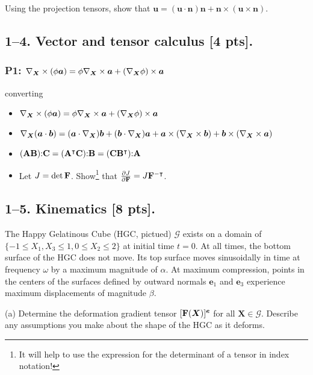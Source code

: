 Using the projection tensors, show that $\bm{u} = (\bm{u} \cdot \bm{n}) \bm{n} + \bm{n} \times (\bm{u} \times \bm{n} )$.

\bigskip
\subsection*{1--4. \textbf{Vector and tensor calculus} [4 pts].} 
\subsubsection*{P1: $\nabla_{\bm{X}} \times (\phi \bm{a}) = \phi \nabla_{\bm{X}} \times \bm{a} + (\nabla_{\bm{X}}\phi) \times \bm{a}$}
converting 

\begin{itemize}
    \item $\nabla_{\bm{X}} \times (\phi \bm{a}) = \phi \nabla_{\bm{X}} \times \bm{a} + (\nabla_{\bm{X}}\phi) \times \bm{a}$
    \item $\nabla_{\bm{X}} (\bm{a} \cdot \bm{b}) = (\bm{a} \cdot \nabla_{\bm{X}}) \bm{b} + (\bm{b} \cdot \nabla_{\bm{X}}) \bm{a} + \bm{a} \times (\nabla_{\bm{X}} \times \bm{b}) + \bm{b} \times (\nabla_{\bm{X}} \times \bm{a})$
    \item $ (\mathbf{A} \mathbf{B}) \mathbf{:} \mathbf{C} = (\mathbf{A}^\intercal \mathbf{C})\mathbf{:} \mathbf{B} = (\mathbf{C} \mathbf{B}^\intercal)\mathbf{:} \mathbf{A}$
    \item Let $J = \det \mathbf{F}$. Show\footnote{It will help to use the expression for the determinant of a tensor in index notation!} that $\frac{\partial J}{\partial \mathbf{F}} = J \mathbf{F}^{-\intercal}$. 
    \end{itemize}

\bigskip
\subsection*{1--5. \textbf{Kinematics} [8 pts].} The Happy Gelatinous Cube (HGC, pictued) $\mathcal{G}$ exists on a domain of $\{-1\leq X_1 , X_3\leq1, 0\leq X_2 \leq 2\}$ at initial time $t=0$. 
At all times, the bottom surface of the HGC does not move. 
Its top surface moves sinusoidally in time at frequency $\omega$ by a maximum magnitude of $\alpha$. 
At maximum compression, points in the centers of the surfaces defined by outward normals $\bm{e}_1$ and $\bm{e}_3$ experience maximum displacements of magnitude $\beta$. 

\medskip
(a) Determine the deformation gradient tensor $[\mathbf{F}(\bm{X})]^{\bm{e}}$ for all $\bm{X}\in \mathcal{G}$. 
Describe any assumptions you make about the shape of the HGC as it deforms. 

